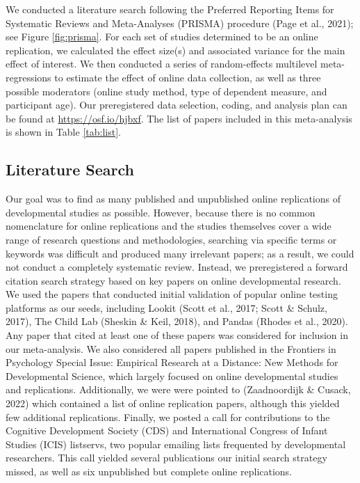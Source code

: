 \documentclass[
  man,floatsintext]{apa6}
\begin{document}
We conducted a literature search following the Preferred Reporting Items for Systematic Reviews and Meta-Analyses (PRISMA) procedure (Page et al., 2021); see Figure \ref{fig:prisma}. For each set of studies determined to be an online replication, we calculated the effect size(s) and associated variance for the main effect of interest. We then conducted a series of random-effects multilevel meta-regressions to estimate the effect of online data collection, as well as three possible moderators (online study method, type of dependent measure, and participant age). Our preregistered data selection, coding, and analysis plan can be found at \href{}{https://osf.io/hjbxf}. The list of papers included in this meta-analysis is shown in Table \ref{tab:list}.

\hypertarget{literature-search}{%
\subsection{Literature Search}\label{literature-search}}

Our goal was to find as many published and unpublished online replications of developmental studies as possible. However, because there is no common nomenclature for online replications and the studies themselves cover a wide range of research questions and methodologies, searching via specific terms or keywords was difficult and produced many irrelevant papers; as a result, we could not conduct a completely systematic review. Instead, we preregistered a forward citation search strategy based on key papers on online developmental research. We used the papers that conducted initial validation of popular online testing platforms as our seeds, including Lookit (Scott et al., 2017; Scott \& Schulz, 2017), The Child Lab (Sheskin \& Keil, 2018), and Pandas (Rhodes et al., 2020). Any paper that cited at least one of these papers was considered for inclusion in our meta-analysis. We also considered all papers published in the Frontiers in Psychology Special Issue: Empirical Research at a Distance: New Methods for Developmental Science, which largely focused on online developmental studies and replications. Additionally, we were were pointed to (Zaadnoordijk \& Cusack, 2022) which contained a list of online replication papers, although this yielded few additional replications. Finally, we posted a call for contributions to the Cognitive Development Society (CDS) and International Congress of Infant Studies (ICIS) listservs, two popular emailing lists frequented by developmental researchers. This call yielded several publications our initial search strategy missed, as well as six unpublished but complete online replications.
\end{document}
